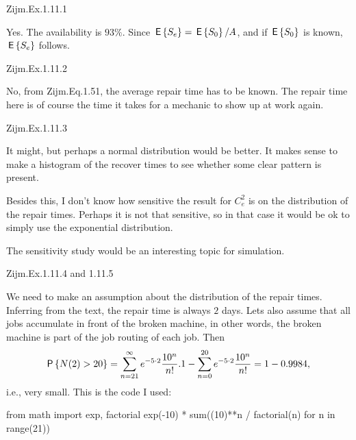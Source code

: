 \begin{exercise}
Zijm.Ex.1.11.1
 \begin{solution}
Yes. The availability is $93\%$. Since $\,\mathsf{E}\left\{S_e\right\} = \,\mathsf{E}\left\{S_0\right\}/A$, and if $\,\mathsf{E}\left\{S_0\right\} $ is known, $\,\mathsf{E}\left\{S_e\right\}$ follows.
\end{solution}
\end{exercise}

\begin{exercise}
Zijm.Ex.1.11.2
 \begin{solution}
   No, from Zijm.Eq.1.51, the average repair time has to be known. The
   repair time here is of course the time it takes for a mechanic to
   show up at work again.
\end{solution}
\end{exercise}
\begin{exercise}
Zijm.Ex.1.11.3
 \begin{solution}
   It might, but perhaps a normal distribution would be better. It
   makes sense to make a histogram of the recover times to see whether
   some clear pattern is present. 

   Besides this, I don't know how sensitive the result for $C_e^2$ is
   on the distribution of the repair times. Perhaps it is not that
   sensitive, so in that case it would be ok to simply use the
   exponential distribution. 

The sensitivity study would be an interesting topic for simulation. 
\end{solution}
\end{exercise}
\begin{exercise}
Zijm.Ex.1.11.4 and 1.11.5
 \begin{solution}
   We need to make an assumption about the distribution of the repair
   times. Inferring from the text, the repair time is always $2$
   days. Lets also assume that all jobs accumulate in front of the
   broken machine, in other words, the broken machine is part of the
   job routing of each job. Then
   \begin{equation*}
     \P{N(2) > 20} = 
\sum_{n=21}^\infty e^{-5\cdot 2} \frac{10^n}{n!}.
1  - \sum_{n=0}^{20} e^{-5\cdot 2} \frac{10^n}{n!} = 1-0.9984,
   \end{equation*}
i.e., very small.  This is the code I used: 

\begin{pyconsole}
from math import exp, factorial
exp(-10) * sum((10)**n / factorial(n) for n in range(21))
\end{pyconsole}
\end{solution}
\end{exercise}

